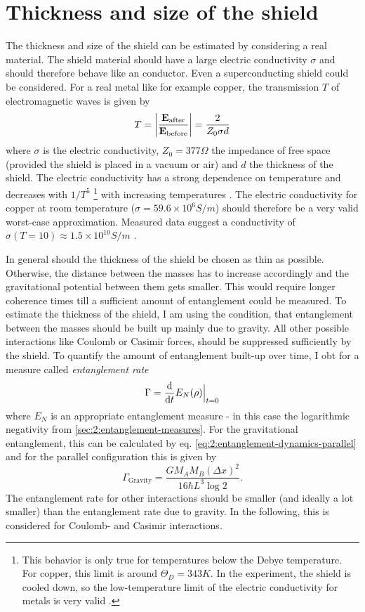 \section{Thickness and size of the shield}\label{sec:5:shield-size}
The thickness and size of the shield can be estimated by considering a real material. The shield material should have a large electric conductivity $\sigma$ and should therefore behave like an conductor. Even a superconducting shield could be considered.
For a real metal like for example copper, the transmission $T$ of electromagnetic waves is given by \cite{Vandenbosch_2022}
\begin{equation}
  T = \abs{\frac{\vec{E}_\mathrm{after}}{\vec{E}_\mathrm{before}}} = \frac{2}{Z_0 \sigma d}
\end{equation}
where $\sigma$ is the electric conductivity, $Z_0 = 377\si{\Omega}$ the impedance of free space (provided the shield is placed in a vacuum or air) and $d$ the thickness of the shield.
The electric conductivity has a strong dependence on temperature and decreases with $1/T^5$ \footnote{This behavior is only true for temperatures below the Debye temperature. For copper, this limit is around $\Theta_D = 343\si{K}$. In the experiment, the shield is cooled down, so the low-temperature limit of the electric conductivity for metals is very valid \cite{Berman_1952}.} with increasing temperatures \cite[p. 284-286]{Gross_2018}. The electric conductivity for copper at room temperature ($\sigma = 59.6\times 10^6 \si{S/m}$) should therefore be a very valid worst-case approximation. 
Measured data suggest a conductivity of $\sigma(T = 10) \approx 1.5\times 10^{10}\si{S/m}$ \cite{Berman_1952}.

In general should the thickness of the shield be chosen as thin as possible. Otherwise, the distance between the masses has to increase accordingly and the gravitational potential between them gets smaller. This would require longer coherence times till a sufficient amount of entanglement could be measured.
To estimate the thickness of the shield, I am using the condition, that entanglement between the masses should be built up mainly due to gravity. All other possible interactions like Coulomb or Casimir forces, should be suppressed sufficiently by the shield.
To quantify the amount of entanglement built-up over time, I obt for a measure called \emph{entanglement rate}
\begin{equation}\label{eq:5:entanglement-rate}
  \Gamma = \dv{t} E_N(\rho)\Big|_{t=0}
\end{equation} 
where $E_N$ is an appropriate entanglement measure - in this case the logarithmic negativity from \cref{sec:2:entanglement-measures}.
For the gravitational entanglement, this can be calculated by eq. \eqref{eq:2:entanglement-dynamics-parallel} and for the parallel configuration this is given by
\begin{equation}\label{eq:5:entanglement-rate-gravity}
  \Gamma_\mathrm{Gravity} = \frac{G M_A M_B (\Delta x)^2}{16 \hbar L^3 \log 2} .
\end{equation}
The entanglement rate for other interactions should be smaller (and ideally a lot smaller) than the entanglement rate due to gravity.
In the following, this is considered for Coulomb- and Casimir interactions.

